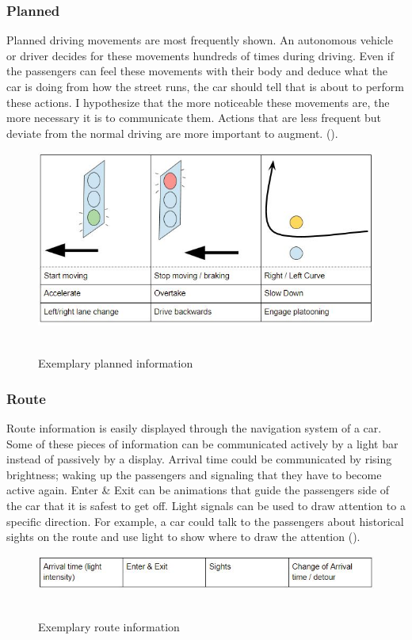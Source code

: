 \subsubsection{Planned}
Planned driving movements are most frequently shown. An autonomous vehicle or driver decides for these movements hundreds of times during driving. Even if the passengers can feel these movements with their body and deduce what the car is doing from how the street runs, the car should tell that is about to perform these actions. I hypothesize that the more noticeable these movements are, the more necessary it is to communicate them. Actions that are less frequent but deviate from the normal driving are more important to augment. (\emph{}). 
\begin{figure}
    \includegraphics[width=1\textwidth]{fig/planned.JPG}\hfill\
    \caption[Planned information]{Exemplary planned information}
    \label{fig:planned}
\end{figure}

\subsubsection{Route}
Route information is easily displayed through the navigation system of a car. Some of these pieces of information can be communicated actively by a light bar instead of passively by a display. Arrival time could be communicated by rising brightness; waking up the passengers and signaling that they have to become active again. Enter \& Exit can be animations that guide the passengers side of the car that it is safest to get off. Light signals can be used to draw attention to a specific direction. For example, a car could talk to the passengers about historical sights on the route and use light to show where to draw the attention (\emph{}). 
\begin{figure}
    \includegraphics[width=1\textwidth]{fig/route.JPG}\hfill\
    \caption[Route information]{Exemplary route information}
    \label{fig:route}
\end{figure}

